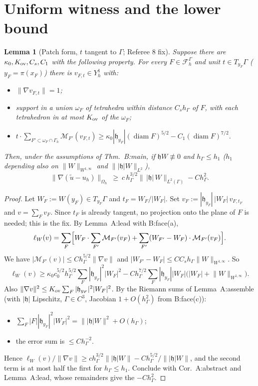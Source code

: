 \documentclass[11pt]{article}
\newtheorem{lemma}[theorem]{Lemma}
\theoremstyle{definition}
\newcommand{\hG}{h_\Gamma}
\newcommand{\Gh}{\Gamma_h}
\newcommand{\FG}{\mathcal F_h^\Gamma}
\newcommand{\M}{\mathcal M}
\newcommand{\hh}{\mathfrak h}
\newcommand{\norm}[1]{\lVert #1\rVert}
\DeclareMathOperator{\diam}{diam}
\begin{document}
\section{Uniform witness and the lower bound}\label{s:main}
\begin{lemma}[Patch form, $t$ tangent to $\Gamma$; Referee 8 fix]\label{l:patch}
Suppose there are $\kappa_0,K_{\rm ov},C_s,C_1$ with the following property. For every $F\in\FG$ and unit $t\in T_{y_F}\Gamma$ ($y_F=\pi(x_F)$) there is $v_{F,t}\in Y_h^1$ with:
\begin{itemize}[leftmargin=1.2em]
\item $\norm{\nabla v_{F,t}}=1$;
\item support in a union $\omega_F$ of tetrahedra within distance $C_s\hG$ of $F$, with each tetrahedron in at most $K_{\rm ov}$ of the $\omega_F$;
\item $t\cdot\sum_{F'\subset\omega_F\cap\Gh}\M_{F'}(v_{F,t})\ge\kappa_0|\hh_{y_F}|(\diam F)^{5/2}-C_1(\diam F)^{7/2}$.
\end{itemize}
Then, under the assumptions of Thm.~B:main, if $\hh W\not\equiv0$ and $\hG\le h_1$ ($h_1$ depending also on $\norm W_{W^{1,\infty}}$ and $\norm{|\hh|W}_{L^2}$),
\[
\norm{\nabla(\tilde u-u_h)}_{\Omega_h}\ \ge\ c\,\hG^{3/2}\bigl\|\,|\hh|\,W\bigr\|_{L^2(\Gamma)}-C\hG^2 .
\]
\end{lemma}
\begin{proof}
Let $W_F:=W(y_F)\in T_{y_F}\Gamma$ and $t_F=W_F/|W_F|$. Set $v_F:=|\hh_{y_F}|\,|W_F|\,v_{F,t_F}$ and $v=\sum_Fv_F$. Since $t_F$ is already tangent, no projection onto the plane of $F$ is needed; this is the fix. By Lemma~A:lead with B:face(a),
\[
\ell_W(v)=\sum_F\Bigl[W_F\cdot\sum_{F'}\M_{F'}(v_F)+\sum_{F'}(W_{F'}-W_F)\cdot\M_{F'}(v_F)\Bigr].
\]
We have $|\M_{F'}(v)|\le C\hG^{5/2}\norm{\nabla v}$ and $|W_{F'}-W_F|\le C C_s\hG\norm W_{W^{1,\infty}}$. So
\[
\ell_W(v)\ge\kappa_0c_0^{5/2}\hG^{5/2}\sum_F|\hh_{y_F}|^2|W_F|^2-C\hG^{7/2}\sum_F|\hh_{y_F}||W_F|\bigl(|W_F|+\norm W_{W^{1,\infty}}\bigr).
\]
Also $\norm{\nabla v}^2\le K_{\rm ov}\sum_F|\hh_{y_F}|^2|W_F|^2$. By the Riemann sums of Lemma~A:assemble (with $|\hh|$ Lipschitz, $\Gamma\in C^3$, Jacobian $1+O(\hG^2)$ from B:face(c)):
\begin{itemize}[leftmargin=1.2em]
\item $\sum_F|F||\hh_{y_F}|^2|W_F|^2=\norm{|\hh|W}^2+O(\hG)$;
\item the error sum is $\le C\hG^{-2}$.
\end{itemize}
Hence $\ell_W(v)/\norm{\nabla v}\ge c\hG^{3/2}\norm{|\hh|W}-C\hG^{5/2}/\norm{|\hh|W}$, and the second term is at most half the first for $\hG\le h_1$. Conclude with Cor.~A:abstract and Lemma~A:lead, whose remainders give the $-C\hG^2$.
\end{proof}
\end{document}

